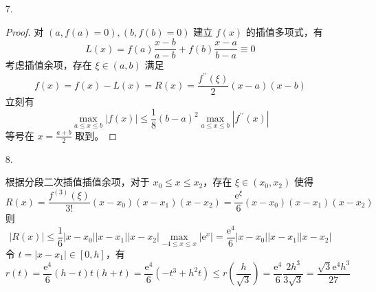 \documentclass{sjtuarticle}
\begin{document}
\begin{itemize}
\begin{proof}
\begin{itemize}
\begin{align*}
                \sum_{j=0}^n (x_j-x)^k l_j(x) &= \sum_{j=0}^n \sum_{l=0}^k \binom{k}{l} x_j^l(-x)^{k-l}l_j(x)\\
                &= \sum_{l=0}^k \binom{k}{l} (-x)^{k-l}  \sum_{j=0}^n x_k^l l_j(x) \\
                &= \sum_{l=0}^k \binom{k}{l} (-x)^{k-l} x^l && \text{由 (1) 可得}\\
                &= (-x+x)^k\\
                &\equiv 0
            \end{align*}
        \end{itemize}
    \end{proof}
    \item[7.] \begin{proof}
        对 $(a,f(a)=0),(b,f(b)=0)$ 建立 $f(x)$ 的插值多项式，有
        \begin{equation*}
            L(x)=f(a)\frac{x-b}{a-b}+f(b)\frac{x-a}{b-a}\equiv 0
        \end{equation*}
        考虑插值余项，存在 $\xi\in (a,b)$ 满足
        \begin{equation*}
            f(x)=f(x)-L(x)=R(x)=\frac{f^{\prime\prime}(\xi)}{2}(x-a)(x-b)%
        \end{equation*}
        立刻有
        \begin{equation*}
            \max_{a\leq x\leq b}|f(x)|\leq \frac{1}{8}(b-a)^2 \max_{a\leq x\leq b}|f^{\prime\prime}(x)|
        \end{equation*}
        等号在 $x=\frac{a+b}{2}$ 取到。
    \end{proof}
    \item[8.] \begin{solution}
        根据分段二次插值插值余项，对于 $x_0\leq x\leq x_2$，存在 $\xi \in (x_0,x_2)$ 使得
        \begin{equation*}
            R(x)=\frac{f^{(3)}(\xi)}{3!}(x-x_0)(x-x_1)(x-x_2)=\frac{\mathrm{e}^\xi}{6}(x-x_0)(x-x_1)(x-x_2)
        \end{equation*}
        则
        \begin{equation*}
            |R(x)|\leq \frac{1}{6}|x-x_0||x-x_1||x-x_2|\max_{-4\leq x\leq x}|\mathrm{e}^x|=\frac{\mathrm{e}^4}{6}|x-x_0||x-x_1||x-x_2|
        \end{equation*}
        令 $t=|x-x_1|\in [0,h]$，有
        \begin{equation*}
            r(t)=\frac{\mathrm{e}^4}{6}(h-t)t(h+t)=\frac{\mathrm{e}^4}{6}(-t^3+h^2t)\leq r\left(\frac{h}{\sqrt{3}}\right)=\frac{\mathrm{e}^4}{6}\frac{2h^3}{3\sqrt{3}}=\frac{\sqrt{3}\mathrm{e}^4h^3}{27}

\end{equation*}
\end{solution}
\end{itemize}
\end{document}
